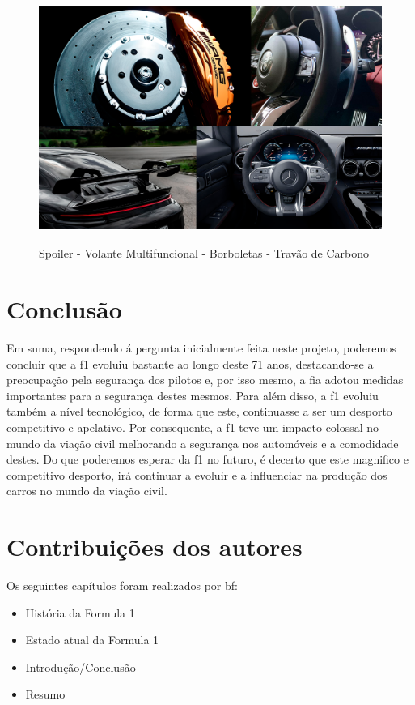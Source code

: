 \documentclass{report}
\begin{document}
\begin{itemize}
\begin{figure}[h]
\center %
\includegraphics[height=230pt]{carro2}
\caption{Spoiler - Volante Multifuncional - Borboletas - Travão de Carbono}
\label{fig:carro2}
\end{figure}

\end{itemize}

\chapter{Conclusão}
Em suma, respondendo á pergunta inicialmente feita neste projeto, poderemos concluir que a \ac{f1} evoluiu bastante ao longo deste 71 anos, destacando-se a preocupação pela segurança dos pilotos e, por isso mesmo, a \ac{fia} adotou medidas importantes para a segurança destes mesmos. Para além disso, a \ac{f1} evoluiu também a nível tecnológico, de forma que este, continuasse a ser um desporto competitivo e apelativo. Por consequente, a \ac{f1} teve um impacto colossal no mundo da viação civil melhorando a segurança nos automóveis e a comodidade destes. Do que poderemos esperar da \ac{f1} no futuro, é decerto que este magnifico e competitivo desporto, irá continuar a evoluir e a influenciar na produção dos carros no mundo da viação civil.

\chapter{Contribuições dos autores}

Os seguintes capítulos foram realizados por \ac{bf}:
\begin{itemize}
\item História da Formula 1
\item Estado atual da Formula 1
\item Introdução/Conclusão
\item Resumo\\[0.5cm]
\end{itemize}
\end{document}

